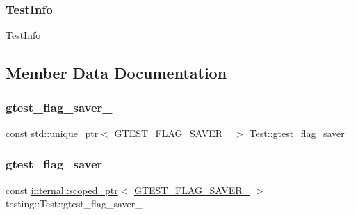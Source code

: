 \subsubsection{\texorpdfstring{TestInfo}{TestInfo}}
{\footnotesize\ttfamily \mbox{\hyperlink{classtesting_1_1_test_info}{Test\+Info}}\hspace{0.3cm}{\ttfamily [friend]}}



\subsection{Member Data Documentation}
\mbox{\label{classtesting_1_1_test_aeab11ec3d1d6f9ff3cfe59b2c73c5454}} 
\subsubsection{\texorpdfstring{gtest\_flag\_saver\_}{gtest\_flag\_saver\_}\hspace{0.1cm}{\footnotesize\ttfamily [1/2]}}
{\footnotesize\ttfamily const std\+::unique\+\_\+ptr$<$ \mbox{\hyperlink{_obj__test_2lib_2googletest-release-1_88_81_2googletest_2include_2gtest_2internal_2gtest-port_8h_a3749ef4fba6b3c3993609b336031644d}{G\+T\+E\+S\+T\+\_\+\+F\+L\+A\+G\+\_\+\+S\+A\+V\+E\+R\+\_\+}} $>$ Test\+::gtest\+\_\+flag\+\_\+saver\+\_\+\hspace{0.3cm}{\ttfamily [private]}}

\mbox{\label{classtesting_1_1_test_a132c542f6932107234988d05a9980e49}} 
\subsubsection{\texorpdfstring{gtest\_flag\_saver\_}{gtest\_flag\_saver\_}\hspace{0.1cm}{\footnotesize\ttfamily [2/2]}}
{\footnotesize\ttfamily const \mbox{\hyperlink{classtesting_1_1internal_1_1scoped__ptr}{internal\+::scoped\+\_\+ptr}}$<$ \mbox{\hyperlink{_obj__test_2lib_2googletest-release-1_88_81_2googletest_2include_2gtest_2internal_2gtest-port_8h_a3749ef4fba6b3c3993609b336031644d}{G\+T\+E\+S\+T\+\_\+\+F\+L\+A\+G\+\_\+\+S\+A\+V\+E\+R\+\_\+}} $>$ testing\+::\+Test\+::gtest\+\_\+flag\+\_\+saver\+\_\+\hspace{0.3cm}{\ttfamily [private]}}



